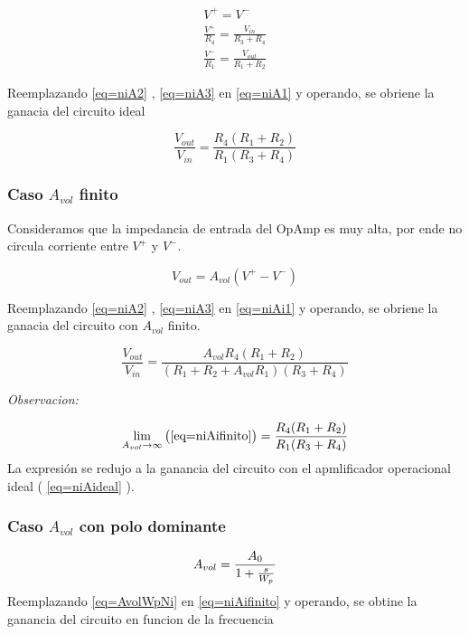 \documentclass[../../main.tex]{subfiles}
\begin{document}
\begin{gather}
V^{+}=V^{-}\label{eq=niA1} \\
\frac{V^{+}}{R_{4}} =  \frac{V_{in}}{R_{3}+R_{4}}\label{eq=niA2}\\
\frac {V^{-}} {R_{1}}=\frac{V_{out}}{R_{1}+R_{2}}\label{eq=niA3}
\end{gather}

Reemplazando \ref{eq=niA2} , \ref{eq=niA3} en \ref{eq=niA1} y operando, se obriene la ganacia del circuito ideal

\begin{equation}
\frac{V_{out}}{V_{in}}= \frac {R_{4}(R_{1}+R_{2})}{R_{1}(R_{3}+R_{4})} \label{eq=niAideal}
\end{equation}




\subsubsection{Caso $A_{vol}$ finito}
Consideramos que la impedancia de entrada del OpAmp es muy alta, por ende no circula corriente entre $V^{+}$ y $V^{-}$.

\begin{equation}
V_{out}=A_{vol}(V^{+}-V^{-})\label{eq=niAi1} 
\end{equation}

Reemplazando \ref{eq=niA2} , \ref{eq=niA3} en \ref{eq=niAi1} y operando, se obriene la ganacia del circuito con $A_{vol}$ finito.

\begin{equation}
 \frac{V_{out}}{V_{in}}=\frac{A_{vol}R_{4}(R_{1}+R_{2})}{(R_{1}+R_{2}+A_{vol}	R_{1})(R_{3}+R_{4})}\label{eq=niAifinito} 
\end{equation}

\textit{Observacion:}

$$ \lim_{A_{vol}\to\infty} \big( \ref{eq=niAifinito} \big) = \frac {R_{4}(R_{1}+R_{2})}{R_{1}(R_{3}+R_{4})} $$
La expresión se redujo a la ganancia del circuito con el apmlificador operacional ideal \big( \ref{eq=niAideal} \big).


\subsubsection{Caso $A_{vol}$  con polo dominante}
\begin{equation}
A_{vol }=\frac{A_{0}}{1+\frac{s}{W_{p}}}\label{eq=AvolWpNi}\\
\end{equation} 
Reemplazando \ref{eq=AvolWpNi} en \ref{eq=niAifinito}  y operando, se obtine la ganancia del circuito en funcion de la frecuencia
\end{document}
